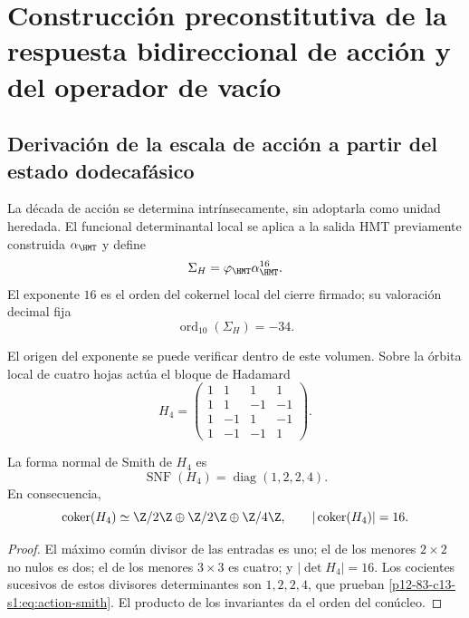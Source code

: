 \label{chap:83-13}

\section{Construcci\'on preconstitutiva de la respuesta bidireccional de acci\'on y del operador de vac\'io}
\label{p12-83-c13-s1:ch:vacuum}

\subsection{Derivaci\'on de la escala de acci\'on a partir del estado dodecaf\'asico}

La d\'ecada de acci\'on se determina intr\'insecamente, sin adoptarla como
unidad heredada. El funcional determinantal local se aplica a la salida HMT
previamente construida \(\alpha_{\HMT}\) y define
\begin{equation}
\Sigma_H=\varphi_{\HMT}\alpha_{\HMT}^{16}.
\label{p12-83-c13-s1:eq:action-determinantal-reader}
\end{equation}
El exponente \(16\) es el orden del cokernel local del cierre firmado; su valoraci\'on decimal fija
\begin{equation}
\operatorname{ord}_{10}(\Sigma_H)=-34.
\label{p12-83-c13-s1:eq:action-decade}
\end{equation}

El origen del exponente se puede verificar dentro de este volumen. Sobre la
\'orbita local de cuatro hojas act\'ua el bloque de Hadamard
\begin{equation}
H_4=
\begin{pmatrix}
1&1&1&1\\
1&1&-1&-1\\
1&-1&1&-1\\
1&-1&-1&1
\end{pmatrix}.
\label{p12-83-c13-s1:eq:action-hadamard}
\end{equation}

\begin{lemma}
La forma normal de Smith de \(H_4\) es
\begin{equation}
\operatorname{SNF}(H_4)=\operatorname{diag}(1,2,2,4).
\label{p12-83-c13-s1:eq:action-smith}
\end{equation}
En consecuencia,
\[
\operatorname{coker}(H_4)\simeq
\Z/2\Z\oplus\Z/2\Z\oplus\Z/4\Z,
\qquad
|\operatorname{coker}(H_4)|=16.
\]
\end{lemma}

\begin{proof}
El m\'aximo com\'un divisor de las entradas es uno; el de los menores
\(2\times2\) no nulos es dos; el de los menores \(3\times3\) es cuatro; y
\(|\det H_4|=16\). Los cocientes sucesivos de estos divisores determinantes
son \(1,2,2,4\), que prueban \cref{p12-83-c13-s1:eq:action-smith}. El producto de los
invariantes da el orden del con\'ucleo.
\end{proof}

